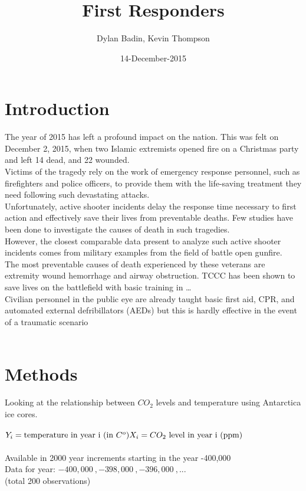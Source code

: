 \documentclass{article}
\title{First Responders}
\author{Dylan Badin, Kevin Thompson}
\date{14-December-2015}
\begin{document}
\maketitle

\section{Introduction}
\textbullet\: The year of 2015 has left a profound impact on the nation. This was felt on December 2, 2015, when two Islamic extremists opened fire on a Christmas party and left 14 dead, and 22 wounded.\\
\textbullet\: Victims of the tragedy rely on the work of emergency response personnel, such as firefighters and police officers, to provide them with the life-saving treatment they need following such devastating attacks.  \\
\textbullet\: Unfortunately, active shooter incidents delay the response time necessary to first action and effectively save their lives from preventable deaths. Few studies have been done to investigate the causes of death in such tragedies. \\
\textbullet\: However, the closest comparable data present to analyze such active shooter incidents comes from military examples from the field of battle open gunfire. \\
\textbullet\: The most preventable causes of death experienced by these veterans are extremity wound hemorrhage and airway obstruction. TCCC has been shown to save lives on the battlefield with basic training in … \\
\textbullet\: Civilian personnel in the public eye are already taught basic first aid, CPR, and automated external defribillators (AEDs) but this is hardly effective in the event of a traumatic scenario \\
\textbullet\:  \\

\section{Methods}
Looking at the relationship between $CO_{2}$ levels and temperature using 
Antarctica ice cores.\\ \\
$Y_{i} = \text{temperature in year i (in $C^{o}$)}
\\ X_{i} = CO_2 \text{ level in year i (ppm)}$ \\ \\
Available in 2000 year increments starting in the year -400,000 \\
Data for year:
$-400,000 \:, -398,000 \:, -396,000 \:, ...$ \\ (total 200 observations)\\ 
\end{document}
